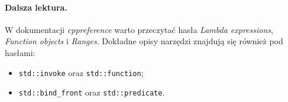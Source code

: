 \paragraph{Dalsza lektura.}
W dokumentacji \emph{cppreference} warto przeczytać hasła
\emph{Lambda expressions}, \emph{Function objects} i \emph{Ranges}.
Dokładne opisy narzędzi znajdują się również pod hasłami:
\begin{itemize}
\item \texttt{std::invoke} oraz \texttt{std::function};
\item \texttt{std::bind\_front} oraz \texttt{std::predicate}.
\end{itemize}
